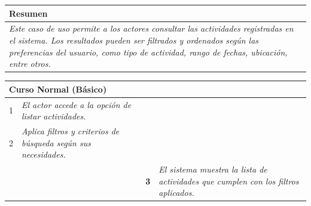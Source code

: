 \begin{table}[H]
    \begin{tabular}{llllllll}
    \hline
    \multicolumn{8}{|l|}{\cellcolor[HTML]{F2F2F2}Resumen}                                                                                                                                                                                                                                                                                                                                                                                             \\ \hline
    \multicolumn{8}{|p{15cm}|}{{\color[HTML]{808080} \textit{Este caso de uso permite a los actores consultar las actividades registradas en el sistema. Los resultados pueden ser filtrados y ordenados según las preferencias del usuario, como tipo de actividad, rango de fechas, ubicación, entre otros.}}} \\ \hline
    \end{tabular}
\end{table}

\begin{table}[H]
    \begin{tabular}{llllllll}
    \hline
    \multicolumn{8}{|l|}{\cellcolor[HTML]{F2F2F2}Curso Normal (Básico)}                                                                                                                                                                                                                                                                          \\ \hline
    \multicolumn{1}{|c|}{1}  & \multicolumn{1}{l|}{{\color[HTML]{808080} \textit{El actor accede a la opción de listar actividades.}}} & \multicolumn{1}{l|}{{\color[HTML]{808080} }}                    & \multicolumn{5}{l|}{{\color[HTML]{808080} }}                                                                                            \\ \hline
    \multicolumn{1}{|c|}{2}   & \multicolumn{1}{p{6cm}|}{{\color[HTML]{808080} \textit{Aplica filtros y criterios de búsqueda según sus necesidades.}}}                                                 & \multicolumn{1}{c|}{} & \multicolumn{5}{p{6cm}|}{{\color[HTML]{808080} \textit{}}}                         \\ \hline
    \multicolumn{1}{|l|}{}   & \multicolumn{1}{l|}{{\color[HTML]{808080} }}                                                          & \multicolumn{1}{l|}{{\color[HTML]{808080} \textbf{3}}}          & \multicolumn{5}{p{6cm}|}{{\color[HTML]{808080} \textit{El sistema muestra la lista de actividades que cumplen con los filtros aplicados.}}} \\ \hline
    \end{tabular}
\end{table}

